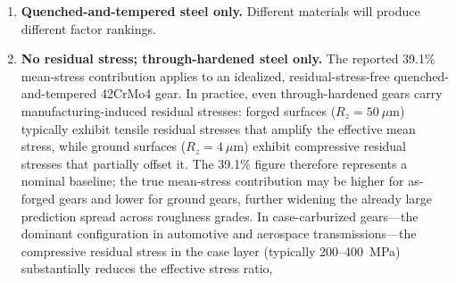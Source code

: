 \documentclass[12pt,a4paper]{article}
\begin{document}
\begin{enumerate}
        I caution that the narrow bootstrap CIs for the dominant factors
        quantify \emph{sampling} variability conditional on the observed
        censoring pattern, not the \emph{identifiability} of the
        underlying parameters. At 64\% censoring, the likelihood surface
        may possess shallow local maxima or flat ridges that bootstrap
        resampling cannot detect because each bootstrap replicate
        inherits the same censoring structure. The numerical variance
        fractions for the three dominant factors (39.1\%, 35.3\%,
        23.5\%) should therefore be interpreted as the best available
        point estimates under the log-normal AFT specification, not as
        uniquely identified values. As a practical check, the EM decomposition
        was repeated with 8 different random seeds; the variance fractions are
        identical to the reported precision across all seeds, confirming that
        the likelihood surface possesses a well-defined global maximum at 64\%
        censoring for this dataset. Their qualitative ranking
        (MS $>$ Std $>$ Rz) is robust across all bootstrap replicates
        and sensitivity analyses reported in this study. The S--N
        curve source ($-0.7$\%) and cumulative damage rule (0.3\%) are
        below the noise floor of the 64\%-censored design and should
        not be assigned physical interpretation.
  \item \textbf{Quenched-and-tempered steel only.} Different materials
        will produce different factor rankings.
  \item \textbf{No residual stress; through-hardened steel only.} The
        reported 39.1\% mean-stress contribution applies to an idealized,
        residual-stress-free quenched-and-tempered 42CrMo4 gear. In
        practice, even through-hardened gears carry manufacturing-induced
        residual stresses: forged surfaces ($R_z=50~\mu$m) typically
        exhibit tensile residual stresses that amplify the effective mean
        stress, while ground surfaces ($R_z=4~\mu$m) exhibit compressive
        residual stresses that partially offset it. The 39.1\% figure
        therefore represents a nominal baseline; the true mean-stress
        contribution may be higher for as-forged gears and lower for
        ground gears, further widening the already large prediction spread
        across roughness grades. In case-carburized gears---the dominant
        configuration in automotive and aerospace transmissions---the
        compressive residual stress in the case layer (typically
        200--400~MPa) substantially reduces the effective stress ratio,

\end{enumerate}
\end{document}
